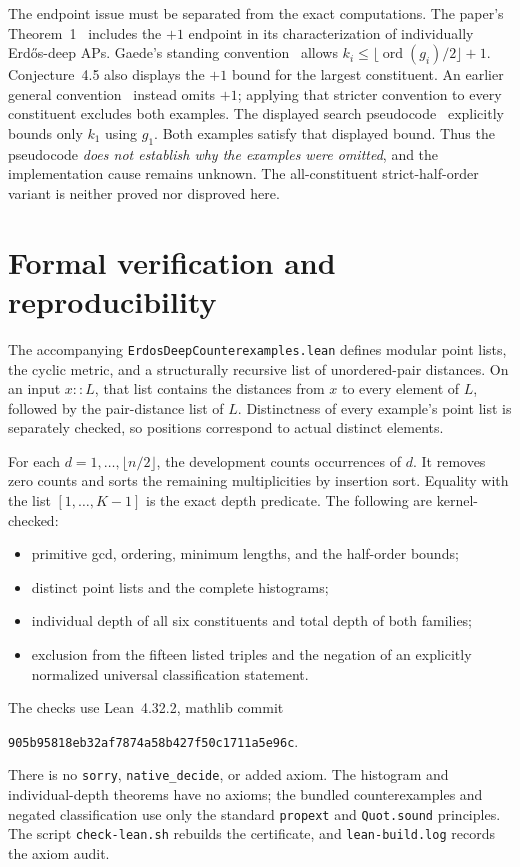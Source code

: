\documentclass[11pt]{article}
\newcommand{\ord}{\operatorname{ord}}
\begin{document}
The endpoint issue must be separated from the exact computations.
The paper's Theorem~1~\cite[p.~3]{DG} includes the $+1$ endpoint
in its characterization of individually Erd\H{o}s-deep APs. Gaede's standing convention~\cite[\S2.2, p.~16]{G} allows
$k_i\le\lfloor\ord(g_i)/2\rfloor+1$. Conjecture~4.5
\cite[pp.~14,42]{G} also displays the $+1$ bound for the largest
constituent. An earlier general convention~\cite[Remark~1.10,
p.~5]{G} instead omits $+1$; applying that stricter convention to
every constituent excludes both examples. The displayed search
pseudocode~\cite[p.~43]{G} explicitly bounds only $k_1$ using $g_1$.
Both examples satisfy that displayed bound. Thus the pseudocode
\emph{does not establish why the examples were omitted}, and the
implementation cause remains unknown. The all-constituent
strict-half-order variant is neither proved nor disproved here.

\newpage
\section{Formal verification and reproducibility}
The accompanying \texttt{ErdosDeepCounterexamples.lean} defines
modular point lists, the cyclic metric, and a structurally recursive
list of unordered-pair distances. On an input $x::L$, that list
contains the distances from $x$ to every element of $L$, followed
by the pair-distance list of $L$. Distinctness of every example's
point list is separately checked, so positions correspond to
actual distinct elements.

For each $d=1,\ldots,\lfloor n/2\rfloor$, the development counts
occurrences of $d$. It removes zero counts and sorts the remaining
multiplicities by insertion sort. Equality with the list
$[1,\ldots,K-1]$ is the exact depth predicate. The following are
kernel-checked:
\begin{itemize}
\item primitive gcd, ordering, minimum lengths, and the
half-order bounds;
\item distinct point lists and the complete histograms;
\item individual depth of all six constituents and total depth of
both families;
\item exclusion from the fifteen listed triples and the negation
of an explicitly normalized universal classification statement.
\end{itemize}
The checks use Lean~4.32.2, mathlib commit
\begin{center}\small\texttt{905b95818eb32af7874a58b427f50c1711a5e96c}.\end{center}
There is no \texttt{sorry}, \texttt{native\_decide}, or added axiom.
The histogram and individual-depth theorems have no axioms;
the bundled counterexamples and negated classification use only
the standard \texttt{propext} and \texttt{Quot.sound} principles.
The script \texttt{check-lean.sh} rebuilds the certificate, and
\texttt{lean-build.log} records the axiom audit.
\end{document}
